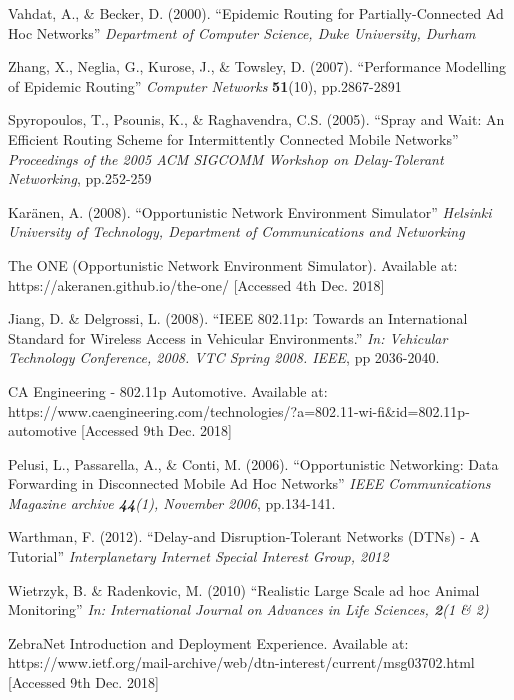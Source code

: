 \documentclass{article}
\begin{document}
\begin{thebibliography}{20}
Vahdat, A., \& Becker, D. (2000).
``Epidemic Routing for Partially-Connected Ad Hoc Networks''
\textit{Department of Computer Science, Duke University, Durham}

Zhang, X., Neglia, G., Kurose, J., \& Towsley, D. (2007).
``Performance Modelling of Epidemic Routing''
\textit{Computer Networks} \textbf{51}(10), pp.2867-2891

Spyropoulos, T., Psounis, K., \& Raghavendra, C.S. (2005).
``Spray and Wait: An Efficient Routing Scheme for
Intermittently Connected Mobile Networks''
\textit{Proceedings of the 2005 ACM SIGCOMM Workshop on Delay-Tolerant Networking}, pp.252-259

Karänen, A. (2008).
``Opportunistic Network Environment Simulator''
\textit{Helsinki University of Technology, Department of Communications and Networking}

The ONE (Opportunistic Network Environment Simulator). Available at: https://akeranen.github.io/the-one/ [Accessed 4th Dec. 2018]

Jiang, D. \& Delgrossi, L. (2008).
``IEEE 802.11p: Towards an International Standard for Wireless Access in Vehicular Environments.'' 
\textit{In: Vehicular Technology Conference, 2008. VTC Spring 2008. IEEE}, pp 2036-2040.

CA Engineering - 802.11p Automotive. Available at: https://www.caengineering.com/technologies/?a=802.11-wi-fi\&id=802.11p-automotive [Accessed 9th Dec. 2018]

Pelusi, L., Passarella, A., \& Conti, M. (2006).
``Opportunistic Networking: Data Forwarding in Disconnected Mobile Ad Hoc Networks''
\textit{IEEE Communications Magazine archive \textbf{44}(1), November 2006}, pp.134-141.

Warthman, F. (2012).
``Delay-and Disruption-Tolerant Networks (DTNs) - A Tutorial'' \textit{Interplanetary Internet Special Interest Group, 2012}

Wietrzyk, B. \& Radenkovic, M. (2010)
``Realistic Large Scale ad hoc Animal Monitoring''
\textit{In: International Journal on Advances in Life Sciences, \textbf{2}(1 \& 2)}

ZebraNet Introduction and Deployment Experience. Available at: https://www.ietf.org/mail-archive/web/dtn-interest/current/msg03702.html [Accessed 9th Dec. 2018]

\end{thebibliography}
 
\end{document}
